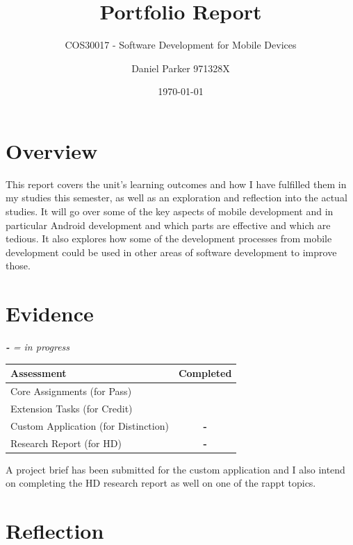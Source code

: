 \documentclass[11pt,english,numbers=endperiod,parskip=half]{scrartcl}
\title{Portfolio Report}
\subtitle{COS30017 - Software Development for Mobile Devices}
\author{Daniel Parker 971328X}
\date{\today}
\newcommand{\cmark}{\ding{51}}
\begin{document}
\maketitle
\thispagestyle{empty}

\section{Overview}
  This report covers the unit's learning outcomes and how I have
  fulfilled them in my studies this semester, as well as an exploration and
  reflection into the actual studies. It will go over some of the key aspects
  of mobile development and in particular Android development and which parts
  are effective and which are tedious. It also explores how some of the
  development processes from mobile development could be used in other areas
  of software development to improve those.

\section{Evidence}
\textit{\textbf{-} = in progress}
  \begin{table}[H]
    \begin{tabular}{|l|c|}
      \hline
      Assessment & Completed \\
      \hline
      Core Assignments (for Pass) & \cmark \\
      \hline
      Extension Tasks (for Credit) & \cmark \\
      \hline
      Custom Application (for Distinction) & \textbf{-} \\
      \hline
      Research Report (for HD) & \textbf{-} \\
      \hline
    \end{tabular}
  \end{table}
  A project brief has been submitted for the custom application and I also
  intend on completing the HD research report as well on one of the rappt topics.
  
\section{Reflection}
\end{document}
